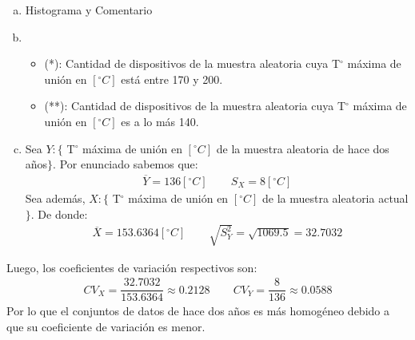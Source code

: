 \begin{solution}
\begin{enumerate}[a)]
\item Histograma y Comentario 
\item 
\begin{itemize}
\item (*): Cantidad de dispositivos de la muestra aleatoria cuya T$^\circ$ máxima de unión en $[^\circ C]$ está entre 170 y 200. 
\item (**):  Cantidad de dispositivos de la muestra aleatoria cuya T$^\circ$ máxima de unión en $[^\circ C]$ es a lo más 140. 
\end{itemize} 
\item Sea $Y:\{$ T$^\circ$ máxima de unión en $[^\circ C]$ de la muestra aleatoria de hace dos años$\}$. Por enunciado sabemos que:
\begin{align*}
\overline{Y}=136 [^\circ C]\hspace{25pt} S_X=8 [^\circ C]
\end{align*}
Sea además, $X:\{$ T$^\circ$ máxima de unión en $[^\circ C]$ de la muestra aleatoria actual $\}$. De donde:
\begin{align*}
\overline{X}=  153.6364 [^\circ C]\hspace{25pt} \sqrt{S_{Y}^2}=\sqrt{1069.5}=32.7032
\end{align*}
\end{enumerate}
Luego, los coeficientes de variación respectivos son:
\begin{align*}
CV_X=\dfrac{32.7032}{153.6364}\approx 0.2128 \hspace{25pt} CV_Y=\dfrac{8}{136}\approx 0.0588
\end{align*}
Por lo que el conjuntos de datos de hace dos años es más homogéneo debido a que su coeficiente de variación es menor. 
\end{solution}